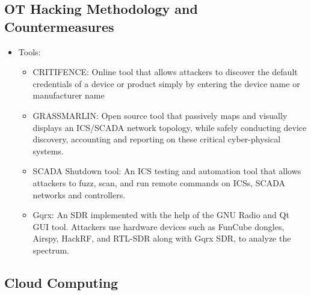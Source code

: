 \subsection{OT Hacking Methodology and Countermeasures}
\begin{itemize}
    \item Tools:
    \begin{itemize}
        \item CRITIFENCE: Online tool that allows attackers to discover the default credentials of a device or product simply by entering the device name or manufacturer name
        \item GRASSMARLIN: Open source tool that passively maps and visually displays an ICS/SCADA network topology, while safely conducting device discovery, accounting and reporting on these critical cyber-physical systems.
        \item SCADA Shutdown tool: An ICS testing and automation tool that allows attackers to fuzz, scan, and run remote commands on ICSs, SCADA networks and controllers.
        \item Gqrx: An SDR implemented with the help of the GNU Radio and Qt GUI tool. Attackers use hardware devices such as FunCube dongles, Airspy, HackRF, and RTL-SDR along with Gqrx SDR, to analyze the spectrum.
    \end{itemize}
\end{itemize}

\subsection{Cloud Computing}

